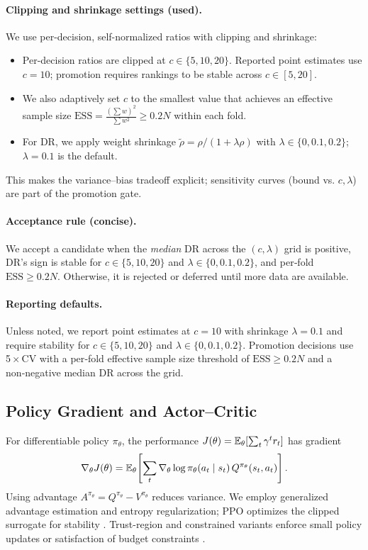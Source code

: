 
\paragraph{Clipping and shrinkage settings (used).} We use per-decision, self-normalized ratios with clipping and shrinkage:
\begin{itemize}
  \item Per-decision ratios are clipped at $c\in\{5,10,20\}$. Reported point estimates use $c=10$; promotion requires rankings to be stable across $c\in[5,20]$.
  \item We also adaptively set $c$ to the smallest value that achieves an effective sample size $\mathrm{ESS}=\tfrac{(\sum w)^2}{\sum w^2}\ge 0.2N$ within each fold.
  \item For DR, we apply weight shrinkage $\tilde \rho=\rho/(1+\lambda\rho)$ with $\lambda\in\{0,0.1,0.2\}$; $\lambda=0.1$ is the default.
\end{itemize}
This makes the variance–bias tradeoff explicit; sensitivity curves (bound vs. $c,\lambda$) are part of the promotion gate.

\paragraph{Acceptance rule (concise).} We accept a candidate when the \emph{median} DR across the $(c,\lambda)$ grid is positive, DR’s sign is stable for $c\in\{5,10,20\}$ and $\lambda\in\{0,0.1,0.2\}$, and per‑fold $\mathrm{ESS}\ge0.2N$. Otherwise, it is rejected or deferred until more data are available.

\paragraph{Reporting defaults.} Unless noted, we report point estimates at $c{=}10$ with shrinkage $\lambda{=}0.1$ and require stability for $c\in\{5,10,20\}$ and $\lambda\in\{0,0.1,0.2\}$. Promotion decisions use 5\,×\,CV with a per‑fold effective sample size threshold of $\mathrm{ESS}\ge 0.2N$ and a non‑negative median DR across the grid.

\subsection{Policy Gradient and Actor--Critic}\label{subsec:pgt}
For differentiable policy $\pi_\theta$, the performance $J(\theta)=\mathbb{E}_\theta[\sum_t \gamma^t r_t]$
has gradient
\[
\nabla_\theta J(\theta) = \mathbb{E}_\theta\!\left[\sum_t \nabla_\theta \log \pi_\theta(a_t\mid s_t)\,Q^{\pi_\theta}(s_t,a_t)\right].
\]
Using advantage $A^{\pi_\theta}=Q^{\pi_\theta}-V^{\pi_\theta}$ reduces variance. We employ generalized advantage estimation and entropy regularization; PPO optimizes the clipped surrogate for stability \citep{schulman2016gae,schulman2017ppo}. Trust-region and constrained variants enforce small policy updates or satisfaction of budget constraints \citep{schulman2015trpo,achiam2017cpo}.

